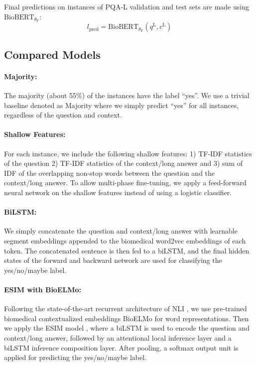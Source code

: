 \documentclass[11pt,a4paper]{article}
\begin{document}
Final predictions on instances of PQA-L validation and test sets are made using $\text{BioBERT}_{\theta_\text{F}}$:
\[
l_\text{pred} = \text{BioBERT}_{\theta_\text{F}}(q^\text{L},c^\text{L})
\]

\subsection{Compared Models}
\paragraph{Majority:} The majority (about 55\%) of the instances have the label ``yes''. We use a trivial baseline denoted as Majority where we simply predict ``yes'' for all instances, regardless of the question and context.

\paragraph{Shallow Features:} For each instance, we include the following shallow features: 1) TF-IDF statistics of the question 2) TF-IDF statistics of the context/long answer and 3) sum of IDF of the overlapping non-stop words between the question and the context/long answer. To allow multi-phase fine-tuning, we apply a feed-forward neural network on the shallow features instead of using a logistic classifier.

\paragraph{BiLSTM:} We simply concatenate the question and context/long answer with learnable segment embeddings appended to the biomedical word2vec embeddings \cite{Pyysalo2013DistributionalSR} of each token. The concatenated sentence is then fed to a biLSTM, and the final hidden states of the forward and backward network are used for classifying the yes/no/maybe label.

\paragraph{ESIM with BioELMo:} Following the state-of-the-art recurrent architecture of NLI \cite{peters2018deep}, we use pre-trained biomedical contextualized embeddings BioELMo \cite{jin2019probing} for word representations. Then we apply the ESIM model \cite{chen2016enhanced}, where a biLSTM is used to encode the question and context/long answer, followed by an attentional local inference layer and a biLSTM inference composition layer. After pooling, a softmax output unit is applied for predicting the yes/no/maybe label.
\end{document}
